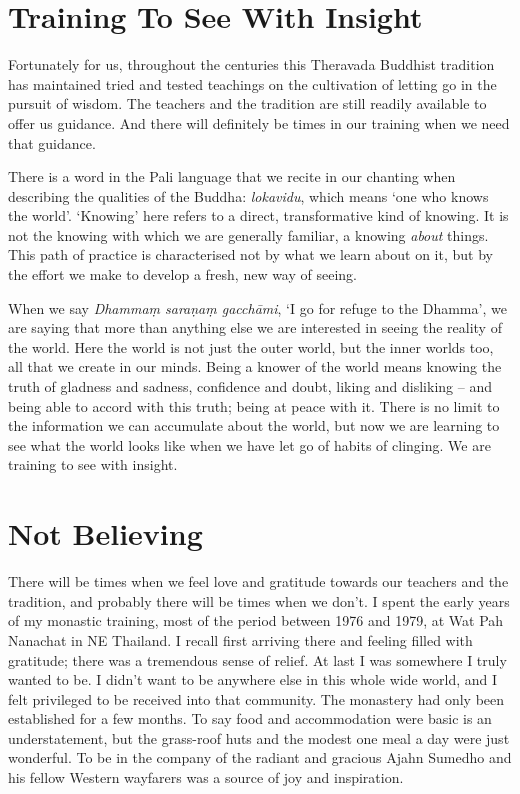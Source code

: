 \section{Training To See With Insight}

Fortunately for us, throughout the centuries this Theravada Buddhist
tradition has maintained tried and tested teachings on the cultivation
of letting go in the pursuit of wisdom. The teachers and the tradition
are still readily available to offer us guidance. And there will
definitely be times in our training when we need that guidance.

There is a word in the Pali language that we recite in our chanting when
describing the qualities of the Buddha: \emph{lokavidu}, which means ‘one who
knows the world’. ‘Knowing’ here refers to a direct, transformative kind
of knowing. It is not the knowing with which we are generally familiar,
a knowing \emph{about} things. This path of practice is characterised not by
what we learn about on it, but by the effort we make to develop a fresh,
new way of seeing.

When we say \emph{Dhammaṃ saraṇaṃ gacchāmi}, ‘I go for refuge to the Dhamma’,
we are saying that more than anything else we are interested in seeing
the reality of the world. Here the world is not just the outer world,
but the inner worlds too, all that we create in our minds. Being a
knower of the world means knowing the truth of gladness and sadness,
confidence and doubt, liking and disliking – and being able to accord
with this truth; being at peace with it. There is no limit to the
information we can accumulate about the world, but now we are learning
to see what the world looks like when we have let go of habits of
clinging. We are training to see with insight.

\section{Not Believing}

There will be times when we feel love and gratitude towards our teachers
and the tradition, and probably there will be times when we don’t. I
spent the early years of my monastic training, most of the period
between 1976 and 1979, at Wat Pah Nanachat in NE Thailand. I recall
first arriving there and feeling filled with gratitude; there was a
tremendous sense of relief. At last I was somewhere I truly wanted to
be. I didn’t want to be anywhere else in this whole wide world, and I
felt privileged to be received into that community. The monastery had
only been established for a few months. To say food and accommodation
were basic is an understatement, but the grass-roof huts and the modest
one meal a day were just wonderful. To be in the company of the radiant
and gracious Ajahn Sumedho and his fellow Western wayfarers was a source
of joy and inspiration.

